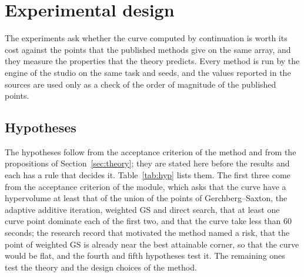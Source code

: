 \section{Experimental design}\label{sec:design}

The experiments ask whether the curve computed by continuation is worth its cost against the points that the published methods give on the same array, and they measure the properties that the theory predicts. Every method is run by the engine of the studio on the same task and seeds, and the values reported in the sources are used only as a check of the order of
magnitude of the published points.

\subsection{Hypotheses}\label{sec:hypotheses}

The hypotheses follow from the acceptance criterion of the method and from the propositions of Section~\ref{sec:theory}; they are stated here before the results and each has a rule that decides it.
Table~\ref{tab:hyp} lists them. The first three come from the acceptance criterion of the module, which asks that the curve have a hypervolume at least that of the union of the points of Gerchberg--Saxton, the adaptive additive iteration, weighted GS and direct search, that at least one curve point dominate each of the first two, and that the curve take less than 60 seconds; the research record
that motivated the method named a risk, that the point of weighted GS is already near the best attainable corner, so that the curve would be flat, and the fourth and fifth hypotheses test it. The remaining ones test the theory and the design choices of the method.

